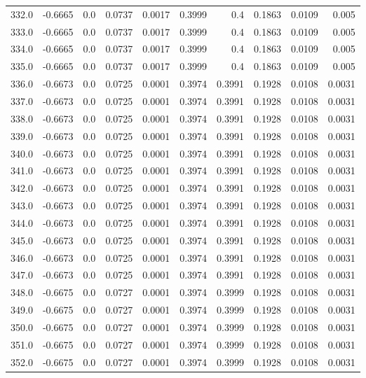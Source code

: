 \begin{longtable}{lrrrrrrrrr}
332.0 & -0.6665 & 0.0 & 0.0737 & 0.0017 & 0.3999 & 0.4 & 0.1863 & 0.0109 & 0.005 \\
333.0 & -0.6665 & 0.0 & 0.0737 & 0.0017 & 0.3999 & 0.4 & 0.1863 & 0.0109 & 0.005 \\
334.0 & -0.6665 & 0.0 & 0.0737 & 0.0017 & 0.3999 & 0.4 & 0.1863 & 0.0109 & 0.005 \\
335.0 & -0.6665 & 0.0 & 0.0737 & 0.0017 & 0.3999 & 0.4 & 0.1863 & 0.0109 & 0.005 \\
336.0 & -0.6673 & 0.0 & 0.0725 & 0.0001 & 0.3974 & 0.3991 & 0.1928 & 0.0108 & 0.0031 \\
337.0 & -0.6673 & 0.0 & 0.0725 & 0.0001 & 0.3974 & 0.3991 & 0.1928 & 0.0108 & 0.0031 \\
338.0 & -0.6673 & 0.0 & 0.0725 & 0.0001 & 0.3974 & 0.3991 & 0.1928 & 0.0108 & 0.0031 \\
339.0 & -0.6673 & 0.0 & 0.0725 & 0.0001 & 0.3974 & 0.3991 & 0.1928 & 0.0108 & 0.0031 \\
340.0 & -0.6673 & 0.0 & 0.0725 & 0.0001 & 0.3974 & 0.3991 & 0.1928 & 0.0108 & 0.0031 \\
341.0 & -0.6673 & 0.0 & 0.0725 & 0.0001 & 0.3974 & 0.3991 & 0.1928 & 0.0108 & 0.0031 \\
342.0 & -0.6673 & 0.0 & 0.0725 & 0.0001 & 0.3974 & 0.3991 & 0.1928 & 0.0108 & 0.0031 \\
343.0 & -0.6673 & 0.0 & 0.0725 & 0.0001 & 0.3974 & 0.3991 & 0.1928 & 0.0108 & 0.0031 \\
344.0 & -0.6673 & 0.0 & 0.0725 & 0.0001 & 0.3974 & 0.3991 & 0.1928 & 0.0108 & 0.0031 \\
345.0 & -0.6673 & 0.0 & 0.0725 & 0.0001 & 0.3974 & 0.3991 & 0.1928 & 0.0108 & 0.0031 \\
346.0 & -0.6673 & 0.0 & 0.0725 & 0.0001 & 0.3974 & 0.3991 & 0.1928 & 0.0108 & 0.0031 \\
347.0 & -0.6673 & 0.0 & 0.0725 & 0.0001 & 0.3974 & 0.3991 & 0.1928 & 0.0108 & 0.0031 \\
348.0 & -0.6675 & 0.0 & 0.0727 & 0.0001 & 0.3974 & 0.3999 & 0.1928 & 0.0108 & 0.0031 \\
349.0 & -0.6675 & 0.0 & 0.0727 & 0.0001 & 0.3974 & 0.3999 & 0.1928 & 0.0108 & 0.0031 \\
350.0 & -0.6675 & 0.0 & 0.0727 & 0.0001 & 0.3974 & 0.3999 & 0.1928 & 0.0108 & 0.0031 \\
351.0 & -0.6675 & 0.0 & 0.0727 & 0.0001 & 0.3974 & 0.3999 & 0.1928 & 0.0108 & 0.0031 \\
352.0 & -0.6675 & 0.0 & 0.0727 & 0.0001 & 0.3974 & 0.3999 & 0.1928 & 0.0108 & 0.0031 \\

\end{longtable}
